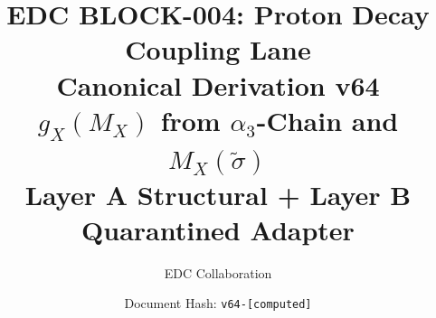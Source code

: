 \documentclass[11pt,a4paper]{article}
\theoremstyle{definition}
\begin{document}

\title{%
  \textbf{EDC BLOCK-004: Proton Decay Coupling Lane}\\[0.5em]
  \Large Canonical Derivation v64\\[0.3em]
  \large $g_X(M_X)$ from $\alpha_3$-Chain and $M_X(\tilde{\sigma})$\\[0.3em]
  \normalsize Layer A Structural + Layer B Quarantined Adapter
}

\author{EDC Collaboration}
\date{Document Hash: \texttt{v64-[computed]}}

\maketitle

\end{document}
